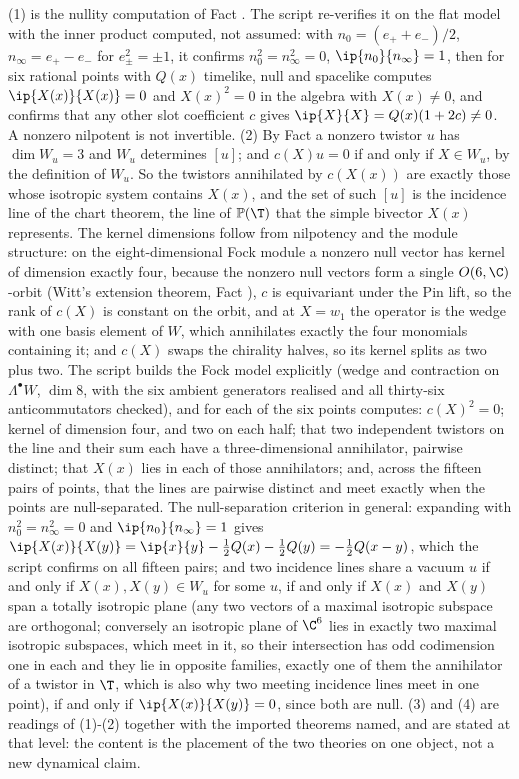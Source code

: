 (1) is the nullity computation of Fact . The script re-verifies it on the flat model with the inner product computed, not assumed: with $n_{0} = (e_{+} + e_{-})/2$, $n_{\infty} = e_{+} - e_{-}$ for $e_{\pm}^{2} = \pm 1$, it confirms $n_{0}^{2} = n_{\infty}^{2} = 0$, $\ip{n_{0}}{n_{\infty}} = 1$, then for six rational points with $Q(x)$ timelike, null and spacelike computes $\ip{X(x)}{X(x)} = 0$ and $X(x)^{2} = 0$ in the algebra with $X(x) \neq 0$, and confirms that any other slot coefficient $c$ gives $\ip{X}{X} = Q(x)(1 + 2c) \neq 0$. A nonzero nilpotent is not invertible. (2) By Fact  a nonzero twistor $u$ has $\dim W_{u} = 3$ and $W_{u}$ determines $[u]$; and $c(X)u = 0$ if and only if $X \in W_{u}$, by the definition of $W_{u}$. So the twistors annihilated by $c(X(x))$ are exactly those whose isotropic system contains $X(x)$, and the set of such $[u]$ is the incidence line of the chart theorem, the line of $\mathbb{P}(\T)$ that the simple bivector $X(x)$ represents. The kernel dimensions follow from nilpotency and the module structure: on the eight-dimensional Fock module a nonzero null vector has kernel of dimension exactly four, because the nonzero null vectors form a single $O(6,\C)$-orbit (Witt's extension theorem, Fact ), $c$ is equivariant under the Pin lift, so the rank of $c(X)$ is constant on the orbit, and at $X = w_{1}$ the operator is the wedge with one basis element of $W$, which annihilates exactly the four monomials containing it; and $c(X)$ swaps the chirality halves, so its kernel splits as two plus two. The script builds the Fock model explicitly (wedge and contraction on $\Lambda^{\bullet}W$, $\dim 8$, with the six ambient generators realised and all thirty-six anticommutators checked), and for each of the six points computes: $c(X)^{2} = 0$; kernel of dimension four, and two on each half; that two independent twistors on the line and their sum each have a three-dimensional annihilator, pairwise distinct; that $X(x)$ lies in each of those annihilators; and, across the fifteen pairs of points, that the lines are pairwise distinct and meet exactly when the points are null-separated. The null-separation criterion in general: expanding with $n_{0}^{2} = n_{\infty}^{2} = 0$ and $\ip{n_{0}}{n_{\infty}} = 1$ gives $\ip{X(x)}{X(y)} = \ip{x}{y} - \tfrac12 Q(x) - \tfrac12 Q(y) = -\tfrac12 Q(x-y)$, which the script confirms on all fifteen pairs; and two incidence lines share a vacuum $u$ if and only if $X(x), X(y) \in W_{u}$ for some $u$, if and only if $X(x)$ and $X(y)$ span a totally isotropic plane (any two vectors of a maximal isotropic subspace are orthogonal; conversely an isotropic plane of $\C^{6}$ lies in exactly two maximal isotropic subspaces, which meet in it, so their intersection has odd codimension one in each and they lie in opposite families, exactly one of them the annihilator of a twistor in $\T$, which is also why two meeting incidence lines meet in one point), if and only if $\ip{X(x)}{X(y)} = 0$, since both are null. (3) and (4) are readings of (1)-(2) together with the imported theorems named, and are stated at that level: the content is the placement of the two theories on one object, not a new dynamical claim.
